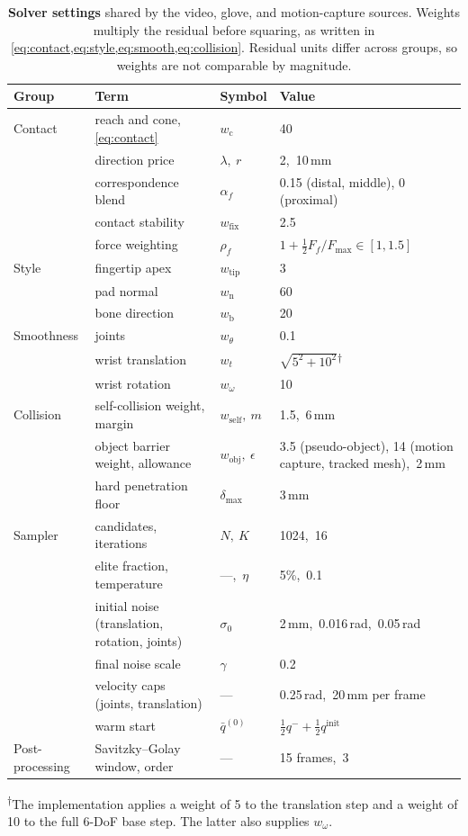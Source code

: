 \begin{table}[t]
\centering\footnotesize
\caption{\textbf{Solver settings} shared by the video, glove, and motion-capture sources. Weights multiply the residual before squaring, as written in \cref{eq:contact,eq:style,eq:smooth,eq:collision}. Residual units differ across groups, so weights are not comparable by magnitude.}
\label{tab:solver}
\begin{tabular}{@{}llll@{}}
\toprule
Group & Term & Symbol & Value \\
\midrule
Contact & reach and cone, \cref{eq:contact} & $w_{\mathrm{c}}$ & 40 \\
 & direction price & $\lambda,\ r$ & 2,\ 10\,mm \\
 & correspondence blend & $\alpha_f$ & 0.15 (distal, middle), 0 (proximal) \\
 & contact stability & $w_{\mathrm{fix}}$ & 2.5 \\
 & force weighting & $\rho_f$ & $1 + \tfrac{1}{2} F_f / F_{\max} \in [1, 1.5]$ \\
\midrule
Style & fingertip apex & $w_{\mathrm{tip}}$ & 3 \\
 & pad normal & $w_{\mathrm{n}}$ & 60 \\
 & bone direction & $w_{\mathrm{b}}$ & 20 \\
\midrule
Smoothness & joints & $w_{\theta}$ & 0.1 \\
 & wrist translation & $w_{t}$ & $\sqrt{5^2 + 10^2}$\textsuperscript{$\dagger$} \\
 & wrist rotation & $w_{\omega}$ & 10 \\
\midrule
Collision & self-collision weight, margin & $w_{\mathrm{self}},\ m$ & 1.5,\ 6\,mm \\
 & object barrier weight, allowance & $w_{\mathrm{obj}},\ \epsilon$ & 3.5 (pseudo-object), 14 (motion capture, tracked mesh),\ 2\,mm \\
 & hard penetration floor & $\delta_{\max}$ & 3\,mm \\
\midrule
Sampler & candidates, iterations & $N,\ K$ & 1024,\ 16 \\
 & elite fraction, temperature & ---,\ $\eta$ & 5\%,\ 0.1 \\
 & initial noise (translation, rotation, joints) & $\sigma_0$ & 2\,mm,\ 0.016\,rad,\ 0.05\,rad \\
 & final noise scale & $\gamma$ & 0.2 \\
 & velocity caps (joints, translation) & --- & 0.25\,rad,\ 20\,mm per frame \\
 & warm start & $\bar{q}^{(0)}$ & $\tfrac{1}{2} q^{-} + \tfrac{1}{2} q^{\mathrm{init}}$ \\
\midrule
Post-processing & Savitzky--Golay window, order & --- & 15 frames,\ 3 \\
\bottomrule
\end{tabular}
\par\smallskip\raggedright\footnotesize\textsuperscript{$\dagger$}The implementation applies a weight of 5 to the translation step and a weight of 10 to the full 6-DoF base step. The latter also supplies $w_{\omega}$.
\end{table}


